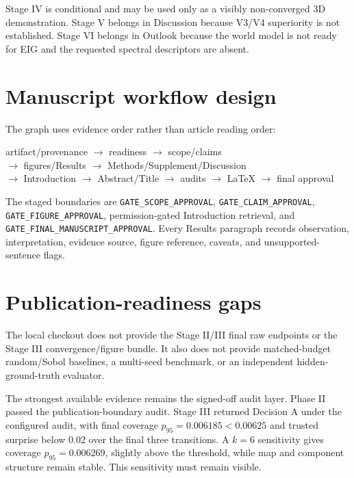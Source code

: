 \documentclass[11pt]{article}
\newcommand{\code}[1]{\texttt{#1}}
\begin{document}
Stage IV is conditional and may be used only as a visibly non-converged 3D
demonstration. Stage V belongs in Discussion because V3/V4 superiority is not
established. Stage VI belongs in Outlook because the world model is not ready
for EIG and the requested spectral descriptors are absent.

\section{Manuscript workflow design}
The graph uses evidence order rather than article reading order:
\begin{center}
\small\ttfamily
artifact/provenance $\rightarrow$ readiness $\rightarrow$ scope/claims\\
$\rightarrow$ figures/Results $\rightarrow$ Methods/Supplement/Discussion\\
$\rightarrow$ Introduction $\rightarrow$ Abstract/Title $\rightarrow$ audits
$\rightarrow$ LaTeX $\rightarrow$ final approval
\end{center}
The staged boundaries are \code{GATE\_SCOPE\_APPROVAL},
\code{GATE\_CLAIM\_APPROVAL}, \code{GATE\_FIGURE\_APPROVAL}, permission-gated
Introduction retrieval, and \code{GATE\_FINAL\_MANUSCRIPT\_APPROVAL}. Every
Results paragraph records observation, interpretation, evidence source, figure
reference, caveats, and unsupported-sentence flags.

\section{Publication-readiness gaps}
The local checkout does not provide the Stage II/III final raw endpoints or the
Stage III convergence/figure bundle. It also does not provide matched-budget
random/Sobol baselines, a multi-seed benchmark, or an independent
hidden-ground-truth evaluator.

The strongest available evidence remains the signed-off audit layer. Phase II
passed the publication-boundary audit. Stage III returned Decision A under the
configured audit, with final coverage $p_{95}=0.006185<0.00625$ and trusted
surprise below 0.02 over the final three transitions. A $k=6$ sensitivity gives
coverage $p_{95}=0.006269$, slightly above the threshold, while map and
component structure remain stable. This sensitivity must remain visible.
\end{document}
